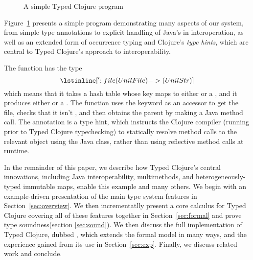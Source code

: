 \begin{figure}
\inputminted[firstline=5,lastline=7]{clojure}{code/demo/src/demo/parent2.clj}
\caption{A simple Typed Clojure program}
\label{fig:ex1}
\end{figure}

Figure~\ref{fig:ex1} presents a simple program demonstrating many
aspects of our system, from simple type annotations to explicit
handling of Java's  in interoperation, as well as an
extended form of occurrence typing and Clojure's \emph{type hints},
which are central to Typed Clojure's approach to interoperability. 

The  function has the type 
$$
\clj{['{:file (U nil File)} -> (U nil Str)]}
$$
which means that it takes a hash table whose  key maps to either
 or a , and it produces either  or a
. The  function uses the  keyword
as an accessor to get the file, checks that it isn't , and
then obtains the parent by making a Java method call.
%
The annotation  is a type hint, which instructs the Clojure
compiler (running prior to Typed Clojure typechecking) to statically
resolve method calls to the relevant object using the Java 
class, rather than using reflective method calls at runtime.

In the remainder of this paper, we describe how Typed Clojure's
central innovations, including Java interoperability, multimethods,
and heterogeneously-typed immutable maps, enable this example and many
others. We begin with an example-driven presentation of the main type
system features in Section~\ref{sec:overview}. We then incrementatlly
present a core calculus for Typed Clojure covering all of these
features together in Section~\ref{sec:formal} and prove type
soundness(section \ref{sec:sound}). We then discuss the full
implementation of Typed Clojure, dubbed \coretyped{}, which extends
the formal model in many ways, and the experience gained from its use
in Section~\ref{sec:exp}. Finally, we discuss related work and
conclude.



